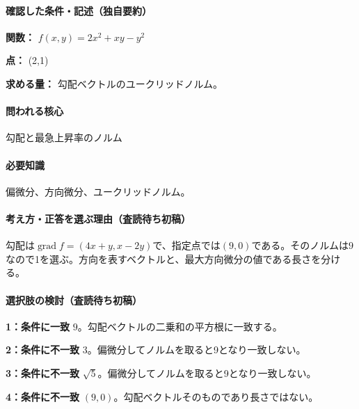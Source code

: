 \paragraph{確認した条件・記述（独自要約）}\mbox{}\par

\noindent\textbf{関数：} \(f(x,y)=2x^2+xy-y^2\)\par

\noindent\textbf{点：} (2,1)\par

\noindent\textbf{求める量：} 勾配ベクトルのユークリッドノルム。\par

\paragraph{問われる核心} 勾配と最急上昇率のノルム

\paragraph{必要知識} 偏微分、方向微分、ユークリッドノルム。

\paragraph{考え方・正答を選ぶ理由（査読待ち初稿）} 勾配は\(\operatorname{grad}f=(4x+y,x-2y)\)で、指定点では\((9,0)\)である。そのノルムは\(9\)なので1を選ぶ。方向を表すベクトルと、最大方向微分の値である長さを分ける。

\paragraph{選択肢の検討（査読待ち初稿）}\mbox{}\par

\noindent\textbf{1：条件に一致} \(9\)。勾配ベクトルの二乗和の平方根に一致する。\par

\noindent\textbf{2：条件に不一致} \(3\)。偏微分してノルムを取ると9となり一致しない。\par

\noindent\textbf{3：条件に不一致} \(\sqrt5\)。偏微分してノルムを取ると9となり一致しない。\par

\noindent\textbf{4：条件に不一致} \((9,0)\)。勾配ベクトルそのものであり長さではない。\par

